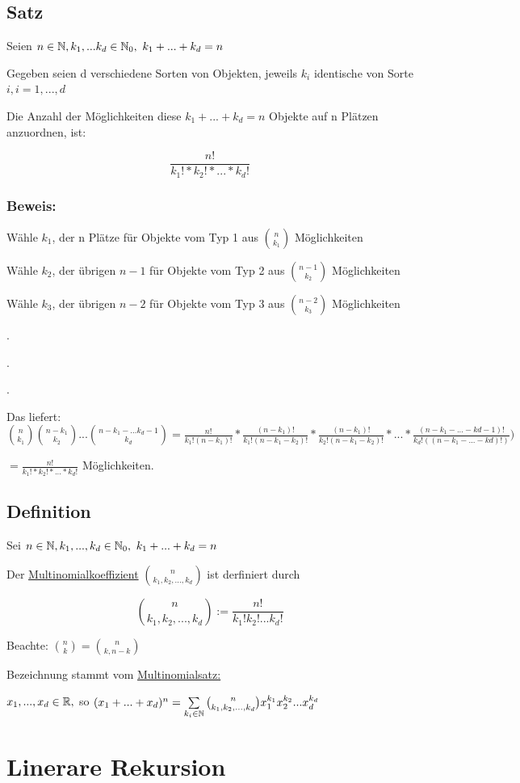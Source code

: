 \subsection{Satz}
Seien $n \in \operatorname{\mathbb{N}} , k_1,...k_d \in \operatorname{\mathbb{N}}_0,~ k_1+...+k_d=n $

Gegeben seien d verschiedene Sorten von Objekten, jeweils $k_i$ identische von Sorte $i, i=1,...,d$

Die Anzahl der Möglichkeiten diese $k_1+...+k_d = n$ Objekte auf n Plätzen anzuordnen, ist:

$$ \frac{n!}{k_1!*k_2!*...*k_d!}$$ 

\subsubsection*{Beweis:}
Wähle $k_1$, der n Plätze für Objekte vom Typ 1 aus $\binom{n}{k_1}$ Möglichkeiten

Wähle $k_2$, der übrigen $n-1$ für Objekte vom Typ 2 aus $\binom{n-1}{k_2}$ Möglichkeiten

Wähle $k_3$, der übrigen $n-2$ für Objekte vom Typ 3 aus $\binom{n-2}{k_3}$ Möglichkeiten


.

.

.


Das liefert: $\binom{n}{k_1}\binom{n-k_1}{k_2}...\binom{n-k_1-...k_d-1}{k_d} = \frac{n!}{k_1!(n-k_1)!}*\frac{(n-k_1)!}{k_1!(n-k_1-k_2)!}*\frac{(n-k_1)!}{k_2!(n-k_1-k_2)!}*...*\frac{(n-k_1-...-k{d-1})!}{k_d!((n-k_1-...-k{d})!)}) $

$= \frac{n!}{k_1!*k_2!*...*k_d!}$ Möglichkeiten.

\subsection{Definition}
Sei $n \in \operatorname{\mathbb{N}}, k_1,...,k_d \in \operatorname{\mathbb{N}}_0,~ k_1+...+k_d = n$

Der \underline{Multinomialkoeffizient} $\binom{n}{k_1,k_2,...,k_d}$ ist derfiniert durch

$$\binom{n}{k_1,k_2,...,k_d} := \frac{n!}{k_1!k_2!...k_d!} $$

Beachte: $\binom{n}{k} = \binom{n}{k,n-k}$

Bezeichnung stammt vom \underline{Multinomialsatz:}

$x_1,...,x_d \in \operatorname{\mathbb{R}},$ so $(x_1+...+x_d)^n= \sum_{k_i \in \N}\binom{n}{k_1,k_2,...,k_d}x_1^{k_1}x_2^{k_2}...x_d^{k_d}$

\section{Linerare Rekursion}
